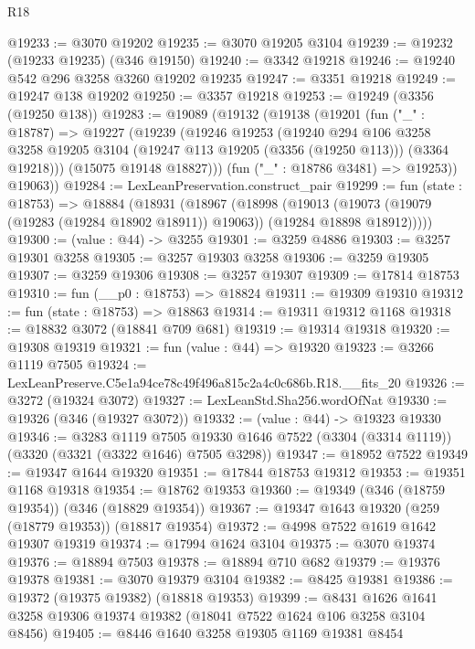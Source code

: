\begin{lexlean}{R18}
\begin{coremodule}
@19233 := @3070 @19202
@19235 := @3070 @19205 @3104
@19239 := @19232 (@19233 @19235) (@346 @19150)
@19240 := @3342 @19218
@19246 := @19240 @542 @296 @3258 @3260 @19202 @19235
@19247 := @3351 @19218
@19249 := @19247 @138 @19202
@19250 := @3357 @19218
@19253 := @19249 (@3356 (@19250 @138))
@19283 := @19089
    (@19132
      (@19138
        (@19201
          (fun ("_" : @18787) =>
          @19227
            (@19239
              (@19246
                @19253
                (@19240
                  @294
                  @106
                  @3258
                  @3258
                  @19205
                  @3104
                  (@19247 @113 @19205 (@3356 (@19250 @113)))
                  (@3364 @19218)))
              (@15075 @19148 @18827)))
          (fun ("_" : @18786 @3481) => @19253))
        @19063))
@19284 := LexLeanPreservation.construct_pair
@19299 := fun (state : @18753) =>
  @18884
    (@18931
      (@18967
        (@18998
          (@19013
            (@19073 (@19079 (@19283 (@19284 @18902 @18911)) @19063))
            (@19284 @18898 @18912)))))
@19300 := (value : @44) -> @3255
@19301 := @3259 @4886
@19303 := @3257 @19301 @3258
@19305 := @3257 @19303 @3258
@19306 := @3259 @19305
@19307 := @3259 @19306
@19308 := @3257 @19307
@19309 := @17814 @18753
@19310 := fun (__p0 : @18753) => @18824
@19311 := @19309 @19310
@19312 := fun (state : @18753) => @18863
@19314 := @19311 @19312 @1168
@19318 := @18832 @3072 (@18841 @709 @681)
@19319 := @19314 @19318
@19320 := @19308 @19319
@19321 := fun (value : @44) => @19320
@19323 := @3266 @1119 @7505
@19324 := LexLeanPreserve.C5e1a94ce78c49f496a815c2a4c0c686b.R18.__fits_20
@19326 := @3272 (@19324 @3072)
@19327 := LexLeanStd.Sha256.wordOfNat
@19330 := @19326 (@346 (@19327 @3072))
@19332 := (value : @44) -> @19323 @19330
@19346 := @3283
    @1119
    @7505
    @19330
    @1646
    @7522
    (@3304 (@3314 @1119))
    (@3320 (@3321 (@3322 @1646) @7505 @3298))
@19347 := @18952 @7522
@19349 := @19347 @1644 @19320
@19351 := @17844 @18753 @19312
@19353 := @19351 @1168 @19318
@19354 := @18762 @19353
@19360 := @19349 (@346 (@18759 @19354)) (@346 (@18829 @19354))
@19367 := @19347 @1643 @19320 (@259 (@18779 @19353)) (@18817 @19354)
@19372 := @4998 @7522 @1619 @1642 @19307 @19319
@19374 := @17994 @1624 @3104
@19375 := @3070 @19374
@19376 := @18894 @7503
@19378 := @18894 @710 @682
@19379 := @19376 @19378
@19381 := @3070 @19379 @3104
@19382 := @8425 @19381
@19386 := @19372 (@19375 @19382) (@18818 @19353)
@19399 := @8431 @1626 @1641 @3258 @19306 @19374 @19382 (@18041 @7522 @1624 @106 @3258 @3104 @8456)
@19405 := @8446 @1640 @3258 @19305 @1169 @19381 @8454

\end{coremodule}
\end{lexlean}
